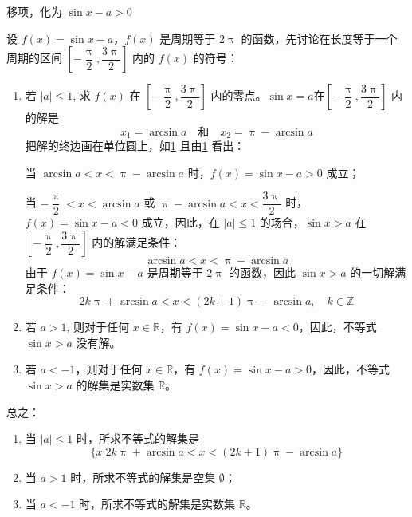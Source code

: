 \begin{solution}
移项，化为 $\sin x-a>0$

设 $f(x)=\sin x-a$，$f(x)$ 是周期等于 $2\uppi$ 的函数，先讨论在长度等于一个周期的区间 $\left[-\dfrac{\uppi}{2}, \dfrac{3\uppi}{2}\right]$ 内的 $f(x)$ 的符号：
\begin{enumerate}
  \item 若 $|a|\leqslant 1$, 求 $f(x)$ 在 $\left[-\dfrac{\uppi}{2}, \dfrac{3\uppi}{2}\right]$ 内的零点。$\sin x=a$在$\left[-\dfrac{\uppi}{2}, \dfrac{3\uppi}{2}\right]$ 内的解是
  \[x_1=\arcsin a \quad \text{和}\quad x_2=\uppi-\arcsin a\]
  把解的终边画在单位圆上，如\cref{fig:unit_circle_solution1} 且由\cref{fig:unit_circle_solution1} 看出：
  \begin{figure}
    \caption{}\label{fig:unit_circle_solution1}
  \end{figure}

  当 $\arcsin a<x<\uppi-\arcsin a$ 时，$f(x)=\sin x-a>0$ 成立；

  当 $-\dfrac{\uppi}{2}<x<\arcsin a$ 或 $\uppi-\arcsin a<x<\dfrac{3\uppi}{2}$ 时，$f(x)=\sin x-a<0$ 成立，因此，在 $|a|\leqslant 1$ 的场合，$\sin x>a$ 在 $\left[-\dfrac{\uppi}{2}, \dfrac{3\uppi}{2}\right]$ 内的解满足条件：
  \[\arcsin a<x<\uppi-\arcsin a\]
  由于 $f(x)=\sin x-a$ 是周期等于 $2\uppi$ 的函数，因此 $\sin x>a$ 的一切解满足条件：
  \[2k\uppi+\arcsin a<x<(2k+1)\uppi-\arcsin a,\quad k\in\mathbb{Z}\]
  \item 若 $a>1$, 则对于任何 $x\in\mathbb{R}$，有 $f(x)=\sin x-a<0$，因此，不等式 $\sin x>a$ 没有解。
  \item 若 $a<-1$，则对于任何 $x\in\mathbb{R}$，有 $f(x)=\sin x-a>0$，因此，不等式 $\sin x>a$ 的解集是实数集 $\mathbb{R}$。
\end{enumerate}

总之：
\begin{enumerate}
  \item 当 $|a|\leqslant 1$ 时，所求不等式的解集是
  \[\{x|2k\uppi+\arcsin a<x<(2k+1)\uppi-\arcsin a\}\]
  \item 当 $a>1$ 时，所求不等式的解集是空集 $\emptyset$；
  \item 当 $a<-1$ 时，所求不等式的解集是实数集 $\mathbb{R}$。
\end{enumerate}
\end{solution}

